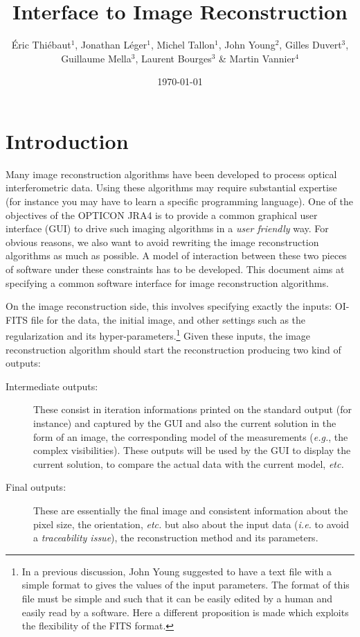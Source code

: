 \documentclass{article}
\begin{document}
\title{Interface to Image Reconstruction}

\author{Éric Thiébaut$^1$, Jonathan Léger$^1$, Michel Tallon$^1$, John
  Young$^2$, Gilles Duvert$^3$, Guillaume Mella$^3$, Laurent Bourges$^3$ \&
  Martin Vannier$^4$}



\date{\today}

\maketitle

\section{Introduction}

Many image reconstruction algorithms have been developed to process optical
interferometric data.  Using these algorithms may require substantial
expertise (for instance you may have to learn a specific programming
language). One of the objectives of the OPTICON JRA4 is to provide a common
graphical user interface (GUI) to drive such imaging algorithms in a
\emph{user friendly} way. For obvious reasons, we also want to avoid rewriting
the image reconstruction algorithms as much as possible.  A model of
interaction between these two pieces of software under these constraints has
to be developed. This document aims at specifying a common software interface
for image reconstruction algorithms.

On the image reconstruction side, this involves specifying exactly the inputs:
OI-FITS file for the data, the initial image, and other settings such as the
regularization and its hyper-parameters.\footnote{In a previous discussion,
John Young suggested to have a text file with a simple format to gives the
values of the input parameters. The format of this file must be simple and
such that it can be easily edited by a human and easily read by a software.
Here a different proposition is made which exploits the flexibility of the
FITS format.} Given these inputs, the image reconstruction algorithm should
start the reconstruction producing two kind of outputs:
\begin{description}
  \item[Intermediate outputs:]  These consist in iteration informations
  printed on the standard output (for instance)  and captured by the GUI and
  also the current solution in the form of an image, the corresponding model
  of the measurements (\emph{e.g.}, the complex visibilities).  These outputs
  will be used by the GUI to display the current solution, to compare the
  actual data with the current model, \emph{etc.}

  \item[Final outputs:]  These are essentially the final image and consistent
  information about the pixel size, the orientation, \emph{etc.} but also
  about the input data (\emph{i.e.} to avoid a \emph{traceability issue}), the
  reconstruction method and its parameters.
\end{description}
\end{document}
